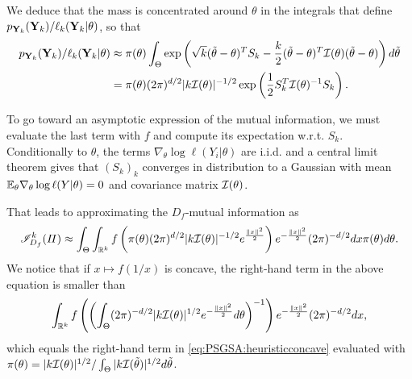         We deduce that the mass is concentrated around
        $\theta$ in the integrals that define $p_{\mathbf{Y}_k}(\mathbf{Y}_k)/\ell_k(\mathbf{Y}_k|\theta)$, so that
            \begin{equation}
                \begin{aligned}
                p_{\mathbf{Y}_k}(\mathbf{Y}_k)/\ell_k(\mathbf{Y}_k|\theta) &\approx \pi(\theta)\int_\Theta\exp\left(\sqrt{k}(\tilde\theta-\theta)^TS_k - \frac{k}{2} (\tilde\theta-\theta)^T\mathcal{I}(\theta)(\tilde\theta-\theta)  \right)d\tilde\theta\\ 
                &= \pi(\theta)(2\pi)^{d/2}|k\mathcal{I}(\theta)|^{-1/2}\exp\left(\frac{1}{2}S_k^T\mathcal{I}(\theta)^{-1}S_k \right).
                \end{aligned}
            \end{equation} 


        To go toward an asymptotic expression of the mutual information, we must evaluate the last term with $f$ and compute its expectation w.r.t. $S_k$.
        Conditionally to $\theta$, the terms $\nabla_\theta\log\ell(Y_i|\theta)$ are i.i.d. and a central limit theorem gives that $(S_k)_k$ converges in distribution to a Gaussian with mean $\mathbb{E}_{\theta}\nabla_\theta\log\ell(Y|\theta)=0$ and covariance matrix $\mathcal{I}(\theta)$.
        
        That leads to approximating the $D_f$-mutual information  as 
            \begin{equation}\label{eq:PSGSA:heuristicconcave}
                \mathscr{I}_{D_f}^k(\varPi) \approx \int_\Theta\int_{\mathbb{R}^k} f\left(\pi(\theta)(2\pi)^{d/2}|k\mathcal{I}(\theta)|^{-1/2}e^{\frac{\|x\|^2}{2}}\right) e^{-\frac{\|x\|^2}{2}} (2\pi)^{-d/2}dx\pi(\theta)d\theta.
            \end{equation}
        We notice that if $x\mapsto f(1/x)$ is concave, the right-hand term in the above equation is smaller than 
            \begin{equation}
                 \int_{\mathbb{R}^k}f\left(\left(\int_\Theta (2\pi)^{-d/2}|k\mathcal{I}(\theta)|^{1/2} e^{-\frac{\|x\|^2}{2}}d\theta\right)^{-1}\right)e^{-\frac{\|x\|^2}{2}}(2\pi)^{-d/2}dx ,
            \end{equation}
        which equals the right-hand term in \cref{eq:PSGSA:heuristicconcave} evaluated with $\pi(\theta) = |k\mathcal{I}(\theta)|^{1/2} / \int_\Theta|k\mathcal{I}(\tilde\theta)|^{1/2} d\tilde\theta$.

